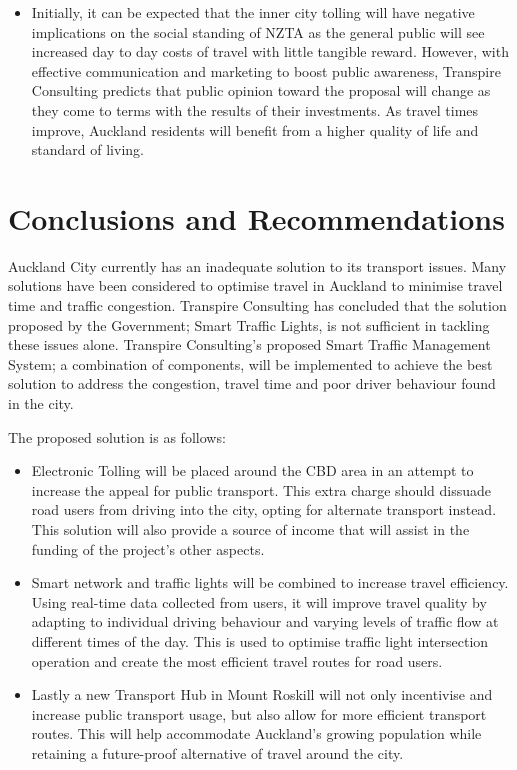 \documentclass[twoside, a4paper, 11pt]{article}
\begin{document}
\begin{itemize}
\item Initially, it can be expected that the inner city tolling will have negative implications on the social standing of NZTA as the general public will see increased day to day costs of travel with little tangible reward. However, with effective communication and marketing to boost public awareness, Transpire Consulting predicts that public opinion toward the proposal will change as they come to terms with the results of their investments. As travel times improve, Auckland residents will benefit from a higher quality of life and standard of living.
\end{itemize}

\newpage


\section{Conclusions and Recommendations}
Auckland City currently has an inadequate solution to its transport issues. Many solutions have been considered to optimise travel in Auckland to minimise travel time and traffic congestion. Transpire Consulting has concluded that the solution proposed by the Government; Smart Traffic Lights, is not sufficient in tackling these issues alone. Transpire Consulting's proposed Smart Traffic Management System; a combination of components, will be implemented to achieve the best solution to address the congestion, travel time and poor driver behaviour found in the city.

The proposed solution is as follows:


\begin{itemize}
\item Electronic Tolling will be placed around the CBD area in an attempt to increase the appeal for public transport. This extra charge should dissuade road users from driving into the city, opting for alternate transport instead. This solution will also provide a source of income that will assist in the funding of the project's other aspects.
\item Smart network and traffic lights will be combined to increase travel efficiency. Using real-time data collected from users, it will improve travel quality by adapting to individual driving behaviour and varying levels of traffic flow at different times of the day. This is used to optimise traffic light intersection operation and create the most efficient travel routes for road users.
\item Lastly a new Transport Hub in Mount Roskill will not only incentivise and increase public transport usage, but also allow for more efficient transport routes. This will help accommodate Auckland's growing population while retaining a future-proof alternative of travel around the city.
\end{itemize}
\end{document}
